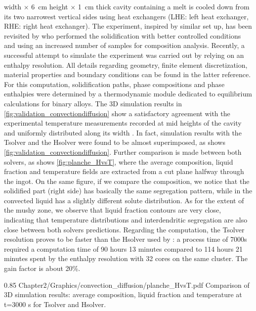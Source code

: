 width $\times$ \SI{6}{\centi \metre} height $\times$ \SI{1}{\centi \metre} thick cavity containing 
a  melt is cooled down from its two 
narrowest vertical sides using heat exchangers (LHE: left heat exchanger, RHE: right heat exchanger). The 
experiment, inspired by \citet{hebditch_observations_1974} similar set up, has been 
revisited by \citet{hachani_experimental_2012} who performed the solidification with better 
controlled conditions and using an increased number of samples for composition analysis. Recently, a successful 
attempt to simulate the experiment was carried out by \citet{carozzani_direct_2013} relying on an enthalpy resolution. 
All details regarding geometry, finite element discretization, material properties 
and boundary conditions can be found in the latter reference. 
For this computation, solidification paths, phase compositions and phase enthalpies were determined by a thermodynamic 
module dedicated to equilibrium calculations for binary alloys. The 3D simulation results in \cref{fig:validation_convectiondiffusion}
show a satisfactory agreement with the experimental temperature measurements recorded at mid heights of the cavity and uniformly 
distributed along its width \citep{carozzani_direct_2013}. In fact, simulation results with the Tsolver and the Hsolver were 
found to be almost superimposed, as shows \cref{fig:validation_convectiondiffusion}. 
Further comparison is made between both solvers, as shows \cref{fig:planche_HvsT}, where the average
composition, liquid fraction and temperature fields are extracted from a cut plane halfway through the ingot. On the same figure,
if we compare the composition, we notice that the solidified part (right side) has basically the same segregation pattern, while
in the convected liquid has a slightly different solute distribution. As for the extent of the mushy zone, we observe that liquid
fraction contours are very close, indicating that temperature distributions and interdendritic segregation are also close between 
both solvers predictions.
Regarding the computation, the Tsolver resolution proves to be 
faster than the Hsolver used by \citet{carozzani_direct_2013}: a process time of 7000s required a computation time of 90 hours 
13 minutes compared to 114 hours 21 minutes spent by the enthalpy resolution with 32 cores on the same cluster. The gain factor 
is about 20\%.
%
\begin{figureth}
{0.85}
{Chapter2/Graphics/convection_diffusion/planche_HvsT.pdf}
{Comparison of 3D simulation results: average composition, liquid fraction and temperature at t=3000 s for Tsolver and Hsolver.}
\label{fig:planche_HvsT}
\end{figureth}
%

